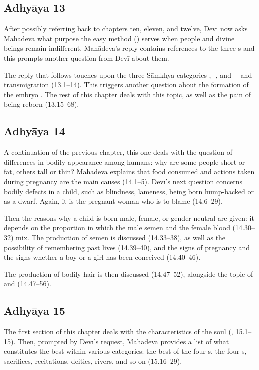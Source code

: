 \subsection*{Adhyāya 13}\label{contents_of_ch13}
After possibly referring back to chapters ten, eleven, and twelve, Devī now asks Mahādeva
what purpose the easy method () serves when people and divine beings remain indifferent.
Mahādeva's reply contains references to the three s and this prompts another question from Devī about them. 

The reply that follows touches upon the three Sāṃkhya categories\linebreak {}-, -, and ---and
transmigration (13.1--14). This triggers another question about the formation of the embryo .
The rest of this chapter deals with this topic, as well as the pain of being reborn (13.15--68).

\subsection*{Adhyāya 14}\label{contents_of_ch14}
A continuation of the previous chapter, this one deals with the question of differences in bodily appearance 
among humans: why are some people short or fat, others tall or thin? Mahādeva explains that food consumed
and actions taken during pregnancy are the main causes (14.1--5). Devī's next question concerns bodily defects in 
a child, such as blindness, lameness, being born hump-backed or as a dwarf. Again, it is the pregnant woman who is
to blame (14.6--29). 

Then the reasons why a child is born male, female, or gender-neutral  are given:
it depends on the proportion in which the male semen and the female blood (14.30--32) mix.
The production of semen is discussed (14.33--38),
as well as the possibility of remembering past lives (14.39--40),
and the signs of pregnancy and the signs whether a boy or a girl has been conceived (14.40--46). 

The production of bodily hair is then discussed (14.47--52), alongside the topic of  and 
(14.47--56).

\subsection*{Adhyāya 15}\label{contents_of_ch15}
The first section of this chapter deals with the characteristics of the soul (, 15.1--15).
Then, prompted by Devī's request, Mahādeva provides a list of what constitutes the best within various categories:
the best of the four s, the four s, sacrifices, recitations,
deities, rivers, and so on (15.16--29).

